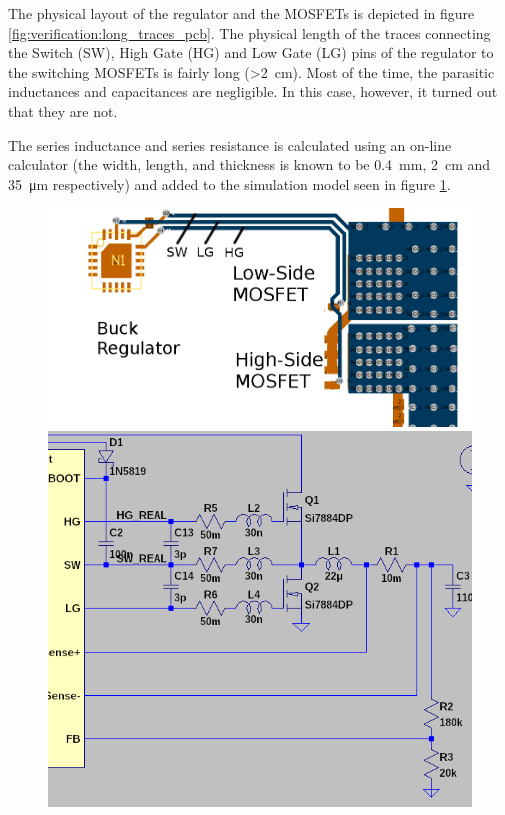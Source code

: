 The physical layout of  the  regulator  and  the  MOSFETs  is depicted in figure
\ref{fig:verification:long_traces_pcb}.  The  physical   length  of  the  traces
connecting the  Switch  (SW),  High  Gate  (HG)  and  Low  Gate (LG) pins of the
regulator to the switching MOSFETs is fairly  long (>\SI{2}{\centi\metre}). Most
of the time, the parasitic  inductances and capacitances are negligible. In this
case, however, it turned out that they are not.

The series  inductance  and  series  resistance  is  calculated using an on-line
calculator\cite{ref:trace_inductance}\cite{ref:trace_resistance}   (the   width,
length,    and    thickness    is    known   to    be    \SI{0.4}{\milli\metre},
\SI{2}{\centi\metre}  and \SI{35}{\micro\metre} respectively) and added  to  the
simulation   model  seen  in  figure   \ref{fig:verification:long_traces_model}.

\begin{figure}[th!]
    \centering
    \begin{minipage}{.6\textwidth}
        \centering
        \includegraphics[width=.9\textwidth]{images/pcb/long-traces.png}
        \caption{}
        \label{fig:verification:long_traces_pcb}
    \end{minipage}
    \begin{minipage}{.38\textwidth}
        \centering
        \includegraphics[width=.9\textwidth]{images/sim/lt3741-transients-circuit-real.png}
        \caption{}
        \label{fig:verification:long_traces_model}
    \end{minipage}
\end{figure}

